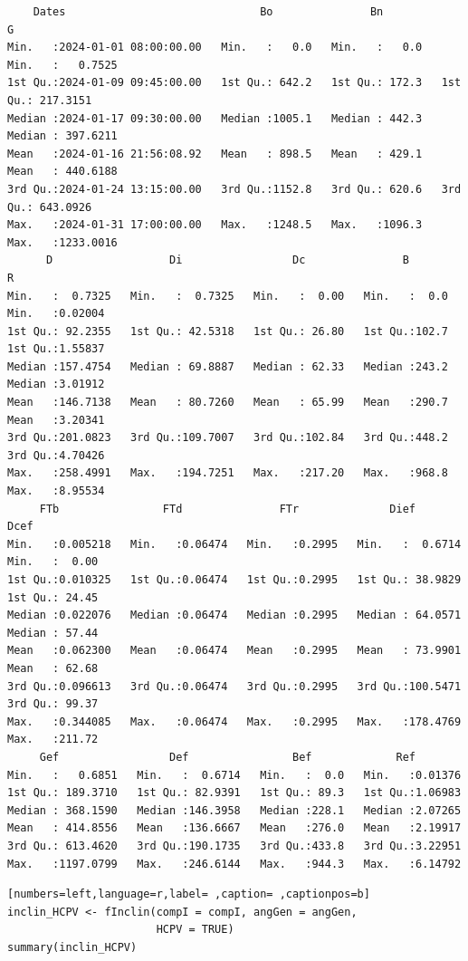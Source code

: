 \begin{itemize}
\begin{verbatim}
    Dates                              Bo               Bn               G            
Min.   :2024-01-01 08:00:00.00   Min.   :   0.0   Min.   :   0.0   Min.   :   0.7525  
1st Qu.:2024-01-09 09:45:00.00   1st Qu.: 642.2   1st Qu.: 172.3   1st Qu.: 217.3151  
Median :2024-01-17 09:30:00.00   Median :1005.1   Median : 442.3   Median : 397.6211  
Mean   :2024-01-16 21:56:08.92   Mean   : 898.5   Mean   : 429.1   Mean   : 440.6188  
3rd Qu.:2024-01-24 13:15:00.00   3rd Qu.:1152.8   3rd Qu.: 620.6   3rd Qu.: 643.0926  
Max.   :2024-01-31 17:00:00.00   Max.   :1248.5   Max.   :1096.3   Max.   :1233.0016  
      D                  Di                 Dc               B               R          
Min.   :  0.7325   Min.   :  0.7325   Min.   :  0.00   Min.   :  0.0   Min.   :0.02004  
1st Qu.: 92.2355   1st Qu.: 42.5318   1st Qu.: 26.80   1st Qu.:102.7   1st Qu.:1.55837  
Median :157.4754   Median : 69.8887   Median : 62.33   Median :243.2   Median :3.01912  
Mean   :146.7138   Mean   : 80.7260   Mean   : 65.99   Mean   :290.7   Mean   :3.20341  
3rd Qu.:201.0823   3rd Qu.:109.7007   3rd Qu.:102.84   3rd Qu.:448.2   3rd Qu.:4.70426  
Max.   :258.4991   Max.   :194.7251   Max.   :217.20   Max.   :968.8   Max.   :8.95534  
     FTb                FTd               FTr              Dief               Dcef       
Min.   :0.005218   Min.   :0.06474   Min.   :0.2995   Min.   :  0.6714   Min.   :  0.00  
1st Qu.:0.010325   1st Qu.:0.06474   1st Qu.:0.2995   1st Qu.: 38.9829   1st Qu.: 24.45  
Median :0.022076   Median :0.06474   Median :0.2995   Median : 64.0571   Median : 57.44  
Mean   :0.062300   Mean   :0.06474   Mean   :0.2995   Mean   : 73.9901   Mean   : 62.68  
3rd Qu.:0.096613   3rd Qu.:0.06474   3rd Qu.:0.2995   3rd Qu.:100.5471   3rd Qu.: 99.37  
Max.   :0.344085   Max.   :0.06474   Max.   :0.2995   Max.   :178.4769   Max.   :211.72  
     Gef                 Def                Bef             Ref         
Min.   :   0.6851   Min.   :  0.6714   Min.   :  0.0   Min.   :0.01376  
1st Qu.: 189.3710   1st Qu.: 82.9391   1st Qu.: 89.3   1st Qu.:1.06983  
Median : 368.1590   Median :146.3958   Median :228.1   Median :2.07265  
Mean   : 414.8556   Mean   :136.6667   Mean   :276.0   Mean   :2.19917  
3rd Qu.: 613.4620   3rd Qu.:190.1735   3rd Qu.:433.8   3rd Qu.:3.22951  
Max.   :1197.0799   Max.   :246.6144   Max.   :944.3   Max.   :6.14792
\end{verbatim}

\begin{lstlisting}[numbers=left,language=r,label= ,caption= ,captionpos=b]
inclin_HCPV <- fInclin(compI = compI, angGen = angGen,
                       HCPV = TRUE)
summary(inclin_HCPV)
\end{lstlisting}


\end{itemize}
